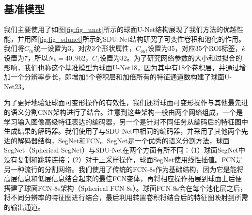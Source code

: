 \subsection{基准模型}
我们主要使用了如图\ref{fig:fig_unet}所示的球面U-Net结构展现了我们方法的优越性能，并用图\ref{fig:fig_sdunet}所示的SDU-Net结构研究了可变性卷积和池化的作用。我们将$C_{in}$统一设置为3，对应3个形状属性，$C_{out}$设置为35，对应35个ROI标签，$k$设置为7，所以$N_k=40,962$，$C_1$设置为32。为了研究网络参数的大小和过拟合的影响，我们也称这个基准模型为球面U-Net18，因为其中有18个卷积层，并通过增加一个分辨率步长，即增加5个卷积层和加倍所有的特征通道数构建了球面U-Net23。

为了更好地验证球面可变形操作的有效性，我们还将球面可变形操作与其他最先进的语义分割CNN架构进行了结合。注意到这些架构一般由两个网络组成，一个是学习输入图像高级特征表达的编码器，另一个是针对不同任务从编码后的特征图中生成结果的解码器。我们使用了与SDU-Net中相同的编码器，并采用了其他两个先进的解码器结构，SegNet\cite{badrinarayanan2017segnet}和FCN\cite{long2015fully}。SegNet是一个优秀的语义分割方法，球面SegNet（Spherical SegNet）与SDU-Net在两个方面有所不同：（1）球面SegNet中没有复制和跳转连接；（2）对于上采样操作，球面SegNet使用线性插值。FCN是另一种流行的分割网络。我们使用了传统的FCN-8s\cite{long2015fully}作为基础结构，因为它是能将高层信息和低层信息结合起来的最佳FCN变体，再将相应操作拓展到球面上后便搭建了球面FCN-8s架构（Spherical FCN-8s）。球面FCN-8s会在每个池化层之后，将不同分辨率的特征图进行结合，最后利用转置卷积将结合后的特征图映射到所需的输出通道。

